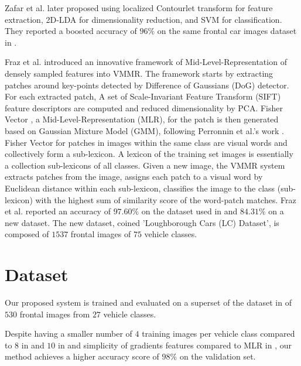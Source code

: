 Zafar et al. \citep{zafar2009localized} later proposed using localized Contourlet transform for feature extraction, 2D-LDA for dimensionality reduction, and SVM for classification.
They reported a boosted accuracy of $96\%$ on the same frontal car images dataset in \citep{zafar2007two}.


Fraz et al. \citep{fraz2014mid} introduced an innovative framework of Mid-Level-Representation of densely sampled features into VMMR.
The framework starts by extracting patches around key-points detected by Difference of Gaussians (DoG) detector.
For each extracted patch, A set of Scale-Invariant Feature Transform (SIFT) \citep{lowe2004distinctive} feature descriptors are computed and reduced dimensionality by PCA.
Fisher Vector \citep{jaakkola1999exploiting}, a Mid-Level-Representation (MLR), for the patch is then generated based on Gaussian Mixture Model (GMM), following Perronnin et al.'s work \citep{perronnin2010improving}.
Fisher Vector for patches in images within the same class are visual words and collectively form a sub-lexicon.
A lexicon of the training set images is essentially a collection sub-lexicons of all classes.
Given a new image, the VMMR system 
extracts patches from the image, 
assigns each patch to a visual word by Euclidean distance within each sub-lexicon, 
classifies the image to the class (sub-lexicon) with the highest sum of similarity score of the word-patch matches.
Fraz et al. reported an accuracy of $97.60\%$ on the dataset used in \citep{zafar2009localized} and $84.31\%$ on a new dataset. The new dataset, coined 'Loughborough Cars (LC) Dataset', is composed of $1537$ frontal images of $75$ vehicle classes.


\section{Dataset}
Our proposed system is trained and evaluated on a superset of the dataset in \citep{zafar2007two,zafar2009localized,fraz2014mid} of $530$ frontal images from $27$ vehicle classes.

Despite having a smaller number of $4$ training images per vehicle class compared to $8$ in \citep{zafar2007two} and $10$ in \citep{zafar2007two} and simplicity of gradients features compared to MLR in \citep{fraz2014mid}, our method achieves a higher accuracy score of $98\%$ on the validation set.






